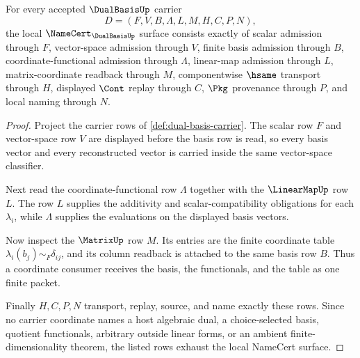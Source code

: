 \begin{theorem}
\label{thm:dual-basis-namecert-obligations}
For every accepted $\DualBasisUp$ carrier
$$
D=(F,V,B,\Lambda,L,M,H,C,P,N),
$$
the local $\NameCert_{\DualBasisUp}$ surface consists exactly of scalar admission through $F$, vector-space admission through $V$, finite basis admission through $B$, coordinate-functional admission through $\Lambda$, linear-map admission through $L$, matrix-coordinate readback through $M$, componentwise $\hsame$ transport through $H$, displayed $\Cont$ replay through $C$, $\Pkg$ provenance through $P$, and local naming through $N$.
\end{theorem}
\begin{proof}
Project the carrier rows of \autoref{def:dual-basis-carrier}. The scalar row $F$ and vector-space row $V$ are displayed before the basis row is read, so every basis vector and every reconstructed vector is carried inside the same vector-space classifier.

Next read the coordinate-functional row $\Lambda$ together with the $\LinearMapUp$ row $L$. The row $L$ supplies the additivity and scalar-compatibility obligations for each $\lambda_i$, while $\Lambda$ supplies the evaluations on the displayed basis vectors.

Now inspect the $\MatrixUp$ row $M$. Its entries are the finite coordinate table $\lambda_i(b_j)\sim_F\delta_{ij}$, and its column readback is attached to the same basis row $B$. Thus a coordinate consumer receives the basis, the functionals, and the table as one finite packet.

Finally $H,C,P,N$ transport, replay, source, and name exactly these rows. Since no carrier coordinate names a host algebraic dual, a choice-selected basis, quotient functionals, arbitrary outside linear forms, or an ambient finite-dimensionality theorem, the listed rows exhaust the local NameCert surface.
\end{proof}

